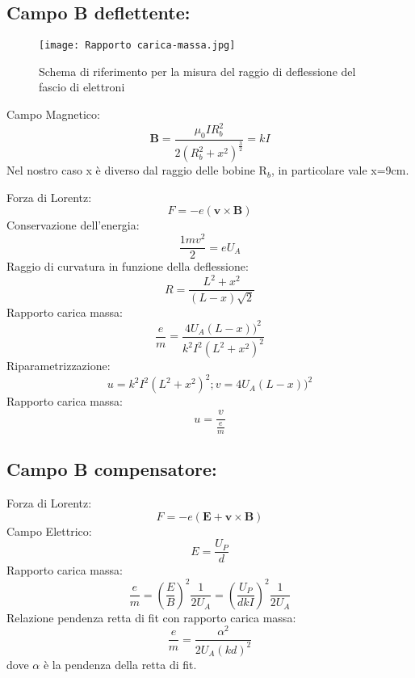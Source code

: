 \documentclass{article}
\begin{document}
\subsection{Campo \textbf{B} deflettente:}
\begin{figure}[h!]
    \texttt{[image: Rapporto carica-massa.jpg]} 
    \caption{Schema di riferimento per la misura del raggio di deflessione del fascio di elettroni}
    \label{figura1}
\end{figure}
Campo Magnetico:
\begin{equation}
    \textbf{B}=\frac{\mu_{0}IR_{b}^2}{2(R_{b}^2 + x^2)^\frac{3}{2}}=kI
\end{equation}
Nel nostro caso x è diverso dal raggio delle bobine R$_{b}$, in particolare vale x=9cm.

Forza di Lorentz:
\begin{equation}
    F=-e(\textbf{v} \times \textbf{B})
\end{equation}
Conservazione dell'energia:
\begin{equation}
    \frac{1mv^2}{2}=eU_{A}
\end{equation}
Raggio di curvatura in funzione della deflessione:
\begin{equation}
    R=\frac{L^2 + x^2}{(L-x)\sqrt{2}}
\end{equation}
Rapporto carica massa:
\begin{equation}
    \frac{e}{m}=\frac{4U_{A}(L-x))^2}{k^2I^2(L^2+x^2)^2}
\end{equation}
Riparametrizzazione:
\begin{equation}
    u=k^2I^2(L^2+x^2)^2;
    v=4U_{A}(L-x))^2
\end{equation}
Rapporto carica massa:
\begin{equation}
    u=\frac{v}{\frac{e}{m}}
\end{equation}

\subsection{Campo \textbf{B} compensatore:}
Forza di Lorentz:
\begin{equation}
    F=-e(\textbf{E}+\textbf{v} \times \textbf{B})
\end{equation}
Campo Elettrico:
\begin{equation}
    E=\frac{U_{P}}{d}
\end{equation}
Rapporto carica massa:
\begin{equation}
    \frac{e}{m}=(\frac{E}{B})^2\frac{1}{2U_{A}}=(\frac{U_{P}}{dkI})^2\frac{1}{2U_{A}}
\end{equation}
Relazione pendenza retta di fit con rapporto carica massa:
\begin{equation}
    \frac{e}{m}=\frac{\alpha^2}{2U_{A}(kd)^2}
\end{equation}
dove $\alpha$ è la pendenza della retta di fit.
~
\end{document}
